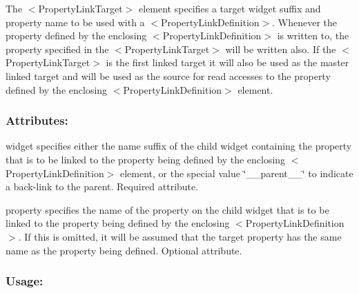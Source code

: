 The {\ttfamily $<$Property\+Link\+Target$>$} element specifies a target widget suffix and property name to be used with a {\ttfamily $<$Property\+Link\+Definition$>$}. Whenever the property defined by the enclosing {\ttfamily $<$Property\+Link\+Definition$>$} is written to, the property specified in the {\ttfamily $<$Property\+Link\+Target$>$} will be written also. If the {\ttfamily $<$Property\+Link\+Target$>$} is the first linked target it will also be used as the \textquotesingle{}master linked target\textquotesingle{} and will be used as the source for read accesses to the property defined by the enclosing {\ttfamily $<$Property\+Link\+Definition$>$} element.\hypertarget{fal_element_ref_fal_elem_propertylinktarget_2}{}\subsubsection{Attributes\+:}\label{fal_element_ref_fal_elem_propertylinktarget_2}
\begin{DoxyItemize}
\item {\ttfamily widget} specifies either the name suffix of the child widget containing the property that is to be linked to the property being defined by the enclosing {\ttfamily $<$Property\+Link\+Definition$>$} element, or the special value {\ttfamily \char`\"{}\+\_\+\+\_\+parent\+\_\+\+\_\+\char`\"{}} to indicate a back-\/link to the parent. Required attribute. \item {\ttfamily property} specifies the name of the property on the child widget that is to be linked to the property being defined by the enclosing {\ttfamily $<$Property\+Link\+Definition$>$}. If this is omitted, it will be assumed that the target property has the same name as the property being defined. Optional attribute.\end{DoxyItemize}
\hypertarget{fal_element_ref_fal_elem_propertylinktarget_3}{}\subsubsection{Usage\+:}\label{fal_element_ref_fal_elem_propertylinktarget_3}

